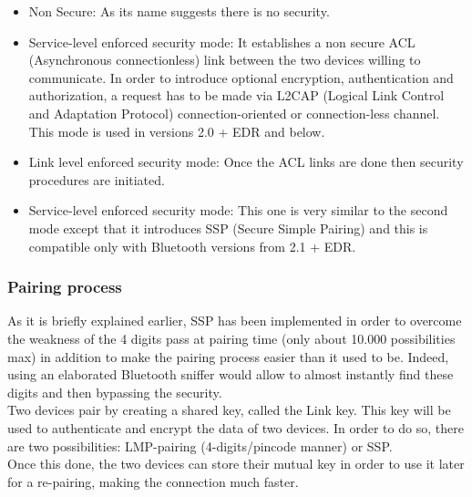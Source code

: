   \begin{itemize}[nolistsep,noitemsep]
  	\item Non Secure: As its name suggests there is no security.
  	\item Service-level enforced security mode: It establishes a non secure ACL (Asynchronous connectionless) link between the two devices willing to communicate. In order to introduce optional encryption, authentication and authorization, a request has to be made via L2CAP (Logical Link Control and Adaptation Protocol) connection-oriented or connection-less channel. This mode is used in versions 2.0 + EDR and below.
  	\item Link level enforced security mode: Once the ACL links are done then security procedures are initiated.
  	\item Service-level enforced security mode: This one is very similar to the second mode except that it introduces SSP (Secure Simple Pairing) and this is compatible only with Bluetooth versions from 2.1 + EDR.
  \end{itemize}

\subsubsection{Pairing process}

As it is briefly explained earlier, SSP has been implemented in order to overcome the weakness of the 4 digits pass at pairing time (only about 10.000 possibilities max) in addition to make the pairing process easier than it used to be. Indeed, using an elaborated Bluetooth sniffer would allow to almost instantly find these digits and then bypassing the security.\\
	
Two devices pair by creating a shared key, called the Link key. This key will be used to authenticate and encrypt the data of two devices.
In order to do so, there are two possibilities: LMP-pairing (4-digits/pincode manner) or SSP. \\
Once this done, the two devices can store their mutual key in order to use it later for a re-pairing, making the connection much faster.\\

